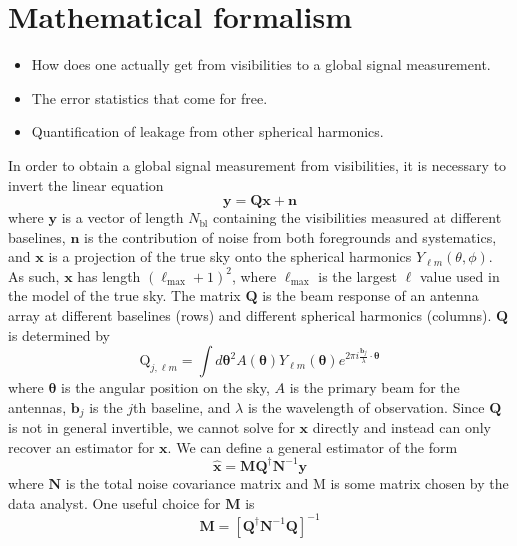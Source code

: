 \documentclass[twolcolumn,apj]{emulateapj}
\newcommand{\y}{\mathbf{y}}
\newcommand{\N}{\mathbf{N}}
\newcommand{\Q}{\mathbf{Q}}
\newcommand{\M}{\mathbf{M}}
\newcommand{\Nbl}{N_{\textrm{bl}}}
\begin{document}
\section{Mathematical formalism}
\begin{itemize}
\item How does one actually get from visibilities to a global signal measurement.
\item The error statistics that come for free.
\item Quantification of leakage from other spherical harmonics.
\end{itemize}

In order to obtain a global signal measurement from visibilities, it is necessary to invert the linear equation 
\begin{equation}
\y = \Q \mathbf{x} + \mathbf{n}
\end{equation}
where $\y$ is a vector of length $\Nbl$ containing the visibilities measured at different baselines, $\mathbf{n}$ is the contribution of noise from both foregrounds and systematics, and $\mathbf{x}$ is a projection of the true sky onto the spherical harmonics $Y_{\ell m}(\theta,\phi)$. As such, $\mathbf{x}$ has length $(\ell_{\textrm{max}}+1)^2$, where $\ell_{\textrm{max}}$ is the largest $\ell$ value used in the model of the true sky. The matrix $\Q$ is the beam response of an antenna array at different baselines (rows) and different spherical harmonics (columns). $\Q$ is determined by 
\begin{equation}
\textrm{Q}_{j,\ell m} = \int d \boldsymbol \theta^2 A(\boldsymbol \theta) Y_{\ell m}(\boldsymbol \theta) e^{2\pi i \frac{\mathbf{b_\textit{j}}}{\lambda} \cdot \boldsymbol \theta}
\end{equation}
where $\boldsymbol \theta$ is the angular position on the sky, $A$ is the primary beam for the antennas, $\mathbf{b_{\textit{j}}}$ is the $j$th baseline, and $\lambda$ is the wavelength of observation. Since $\Q$ is not in general invertible, we cannot solve for $\mathbf{x}$ directly and instead can only recover an estimator for $\mathbf{x}$. We can define a general estimator of the form 
\begin{equation}
\mathbf{\hat x} = \M \Q^\dagger \N^{-1} \y
\end{equation}
where $\N$ is the total noise covariance matrix and M is some matrix chosen by the data analyst. One useful choice for $\M$ is 
\begin{equation}
\M = [\Q^\dagger \N^{-1} \Q]^{-1}
\label{eqn:M}
\end{equation}
\end{document}
